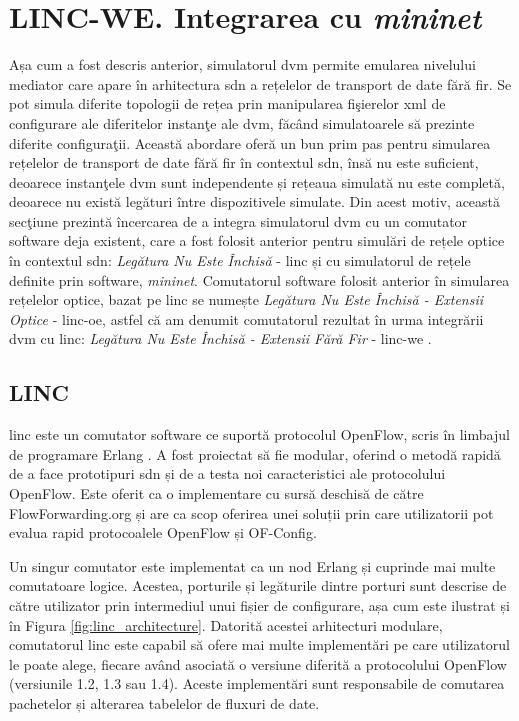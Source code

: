 \section{LINC-WE. Integrarea cu \textit{mininet}}

Așa cum a fost descris anterior, simulatorul \gls{dvm} permite emularea nivelului mediator care apare în arhitectura \gls{sdn} a rețelelor de transport de date fără fir. Se pot simula diferite topologii de rețea prin manipularea fişierelor \gls{xml} de configurare ale diferitelor instanţe ale \gls{dvm}, făcând simulatoarele să prezinte diferite configuraţii. Această abordare oferă un bun prim pas pentru simularea rețelelor de transport de date fără fir în contextul \gls{sdn}, însă nu este suficient, deoarece instanţele \gls{dvm} sunt independente și rețeaua simulată nu este completă, deoarece nu există legături între dispozitivele simulate. Din acest motiv, această secţiune prezintă încercarea de a integra simulatorul \gls{dvm} cu un comutator software deja existent, care a fost folosit anterior pentru simulări de rețele optice în contextul \gls{sdn}: \textit{Legătura Nu Este Închisă} - \gls{linc} și cu simulatorul de rețele definite prin software, \textit{mininet}. Comutatorul software folosit anterior în simularea rețelelor optice, bazat pe \gls{linc} se numește \textit{Legătura Nu Este Închisă - Extensii Optice} - \gls{linc-oe}, astfel că am denumit comutatorul rezultat în urma integrării \gls{dvm} cu \gls{linc}: \textit{Legătura Nu Este Închisă - Extensii Fără Fir} - \gls{linc-we} \cite{stancu2017wireless}.

\subsection{LINC}

\gls{linc} este un comutator software ce suportă protocolul OpenFlow, scris în limbajul de programare Erlang \cite{lincsw}. A fost proiectat să fie modular, oferind o metodă rapidă de a face prototipuri \gls{sdn} și de a testa noi caracteristici ale protocolului OpenFlow. Este oferit ca o implementare cu sursă deschisă de către FlowForwarding.org și are ca scop oferirea unei soluții prin care utilizatorii pot evalua rapid protocoalele OpenFlow și OF-Config.

Un singur comutator este implementat ca un nod Erlang și cuprinde mai multe comutatoare logice. Acestea, porturile și legăturile dintre porturi sunt descrise de către utilizator prin intermediul unui fișier de configurare, așa cum este ilustrat și în Figura \ref{fig:linc_architecture}. Datorită acestei arhitecturi modulare, comutatorul \gls{linc} este capabil să ofere mai multe implementări pe care utilizatorul le poate alege, fiecare având asociată o versiune diferită a protocolului OpenFlow (versiunile 1.2, 1.3 sau 1.4). Aceste implementări sunt responsabile de comutarea pachetelor și alterarea tabelelor de fluxuri de date.

